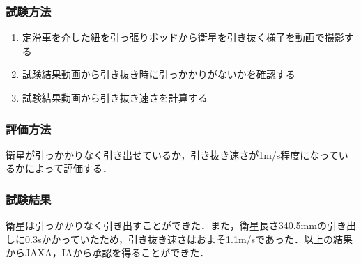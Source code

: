 \subsubsection{試験方法}

\begin{enumerate}
\item 定滑車を介した紐を引っ張りポッドから衛星を引き抜く様子を動画で撮影する
\item 試験結果動画から引き抜き時に引っかかりがないかを確認する
\item 試験結果動画から引き抜き速さを計算する
\end{enumerate}

\subsubsection{評価方法}

衛星が引っかかりなく引き出せているか，引き抜き速さが1m/s程度になっているかによって評価する．

\subsubsection{試験結果}

衛星は引っかかりなく引き出すことができた．また，衛星長さ340.5mmの引き出しに0.3sかかっていたため，引き抜き速さはおよそ1.1m/sであった．以上の結果からJAXA，IAから承認を得ることができた．